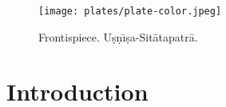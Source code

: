 \documentclass[a4paper, 12pt, oneside]{article}
\begin{document}
\setlength{\parskip}{1mm plus1mm minus1mm}
\setcounter{tocdepth}{3}
\setcounter{secnumdepth}{3}
\tableofcontents
\clearpage
\begin{figure}[H]
\centering
\texttt{[image: plates/plate-color.jpeg]}
\caption*{Frontispiece. U\d{s}\d{n}\={\i}\d{s}a-Sit\={a}tapatr\={a}.}
\end{figure}
\clearpage
\paragraph{}
\section*{Introduction}
\paragraph{}
\end{document}
